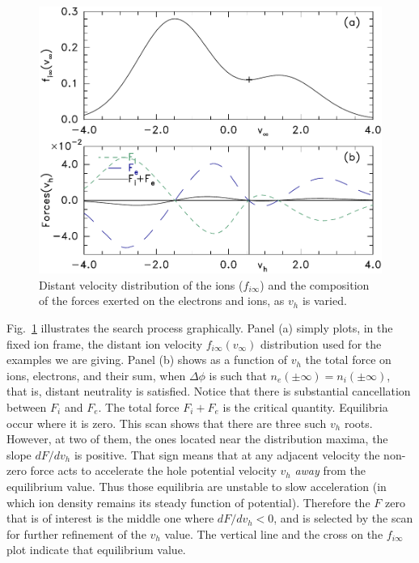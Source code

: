 \documentclass[pre]{revtex4-2}
\begin{document}
\begin{figure}[htp]
  \centering
  \includegraphics[width=0.6\hsize]{forceplot}
  \caption{Distant velocity distribution of the ions ($f_{i\infty}$)
    and the composition of the forces exerted on the electrons and
    ions, as $v_h$ is varied.}
  \label{fig:forceplot}
\end{figure}
Fig.\ \ref{fig:forceplot} illustrates the search process
graphically. Panel (a) simply plots, in the fixed ion frame, the
distant ion velocity $f_{i\infty}(v_\infty)$ distribution used for the
examples we are giving. Panel (b) shows as a function of $v_h$ the
total force on ions, electrons, and their sum, when $\Delta\phi$ is
such that $n_e(\pm\infty)=n_i(\pm\infty)$, that is, distant neutrality
is satisfied. Notice that there is substantial cancellation between
$F_i$ and $F_e$. The total force $F_i+F_e$ is the
critical quantity. Equilibria occur where it is zero. This scan shows
that there are three such $v_h$ roots. However, at two of them, the
ones located near the distribution maxima, the slope $dF/dv_h$ is
positive. That sign means that at any adjacent velocity the non-zero
force acts to accelerate the hole potential velocity $v_h$ \emph{away}
from the equilibrium value. Thus those equilibria are unstable to slow
acceleration (in which ion density remains its steady function of
potential). Therefore the $F$ zero that is of interest is the middle
one where $dF/dv_h<0$, and is selected by the scan for further
refinement of the $v_h$ value. The vertical line and the cross on the
$f_{i\infty}$ plot indicate that equilibrium value.
\end{document}
